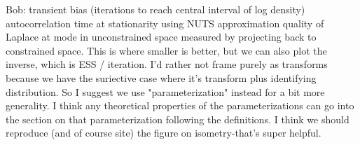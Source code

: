 Bob: transient bias (iterations to reach central interval of log density)
autocorrelation time at stationarity using NUTS
approximation quality of Laplace at mode in unconstrained space measured by projecting back to constrained space. This is where smaller is better, but we can also plot the inverse, which is ESS / iteration. I'd rather not frame purely as transforms because we have the suriective case where it's transform plus identifying distribution. So I suggest we use "parameterization" instead for a bit more generality. I think any theoretical properties of the parameterizations can go into the section on that parameterization following the definitions. I think we should reproduce (and of course site) the figure on isometry-that's super helpful.